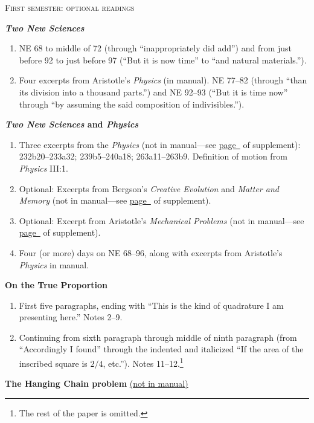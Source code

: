 \documentclass[10pt]{article}
\begin{document}
\bigskip
\begin{center}
	\textsc{\small{First semester: optional readings}}
\end{center}
\textbf{\emph{Two New Sciences}} \label{Galileo}
\begin{enumerate}[noitemsep]
	\item NE 68 to
	middle of 72 (through ``inappropriately
	did add'') and from just before 92 to just before 97
	(``But it is now time'' to ``and
	natural materials.''). 
\item Four excerpts from
	Aristotle’s \emph{Physics} (in manual). NE 77--82 (through
	``than its division into a thousand parts.'')
	and NE 92--93 (``But it is time now'' through
	``by assuming the said composition of
	indivisibles.''). 
\end{enumerate}
\textbf{\emph{Two New Sciences} and \emph{Physics}}
\begin{enumerate}[noitemsep]
	\item Three excerpts from the \emph{Physics} (not
		in manual---see 
		\hyperref[supple.1]{page~\pageref{supple.1}}
		of supplement):
		232b20--233a32; 239b5--240a18;
		263a11--263b9. Definition of motion from
		\emph{Physics} III:1. 
	\item Optional: Excerpts from Bergson's \emph{Creative Evolution} and
		\emph{Matter and Memory} (not in
		manual---see
		\hyperref[supple.7]{page~\pageref{supple.7}}
		of supplement).
	\item Optional: Excerpt from Aristotle's \emph{Mechanical
			Problems} (not in manual---see
		\hyperref[supple.4]{page~\pageref{supple.4}}
		of supplement).
	\item Four (or more) days on NE 68--96, along with
		excerpts from Aristotle's \emph{Physics} in
		manual.
\end{enumerate}
\textbf{On the True Proportion}
	\label{LeibnizProp}
	\begin{enumerate}[noitemsep]
		\item First five paragraphs, ending with ``This is
	the kind of quadrature I am presenting here.'' Notes
	2--9. \item Continuing from sixth paragraph
	through middle of ninth paragraph (from
	``Accordingly I found'' through the indented and
	italicized ``If the area of the
	inscribed square is $2/4$, etc.''). Notes
	11--12.\footnote{The rest of the paper is omitted.}
\end{enumerate}
\textbf{The Hanging Chain problem} \href{https://drive.google.com/file/d/1Q06ypQH26GPMVsxn8SRQVEEn79qmUxOE/view?usp=sharing}{(not in manual)}
\label{LeibnizHang}
\end{document}
